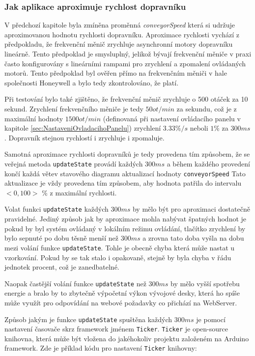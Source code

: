 \subsubsection{Jak aplikace aproximuje rychlost dopravníku}\label{sec:AproximaceRychlostiDopravniku}
V předchozí kapitole byla zmíněna proměnná \textit{conveyorSpeed} která si udržuje aproximovanou hodnotu rychlosti dopravníku. Aproximace rychlosti vychází z předpokladu, že frekvenční měnič zrychluje asynchronní motory dopravníku lineárně. Tento předpoklad je smysluplný, jelikož bývají frekvenční měniče v praxi často konfigurovány s lineárními rampami pro zrychlení a zpomalení ovládaných motorů. Tento předpoklad byl ověřen přímo na frekvenčním měniči v hale společnosti Honeywell a bylo tedy zkontrolováno, že platí.

Při testování bylo také zjištěno, že frekvenční měnič zrychluje o 500 otáček za 10 sekund. Zrychlení frekvenčního měniče je tedy $50ot/min$ za sekundu, což je z maximální hodnoty $1500ot/min$ (definovaná při nastavení ovládacího panelu v kapitole \ref{sec:NastaveniOvladacihoPanelu}) zrychlení $3.33\%/s$ neboli $1\%$ za $300ms$. Dopravník stejnou rychlostí i zrychluje i zpomaluje.

Samotná aproximace rychlosti dopravníků je tedy provedena tím způsobem, že se veřejná metoda \texttt{updateState} provádí každých $300ms$ a během každého provedení končí každá větev stavového diagramu aktualizací hodnoty \texttt{conveyorSpeed} Tato aktualizace je vždy provedena tím způsobem, aby hodnota patřila do intervalu $<0,100>$ \% z maximální rychlosti.

Volat funkci \texttt{updateState} každých $300ms$ by mělo být pro aproximaci dostatečně pravidelné. Jediný způsob jak by aproximace mohla nabývat špatných hodnot je pokud by byl systém ovládaný v lokálním režimu ovládání, tlačítko zrychlení by bylo sepnuté po dobu těsně menší než $300ms$ a zrovna tato doba vyšla na dobu mezi volání funkce \texttt{updateState}. Tohle je obecně chyba která může nastat u vzorkování. Pokud by se tak stalo i opakovaně, stejně by byla chyba v řádu jednotek procent, což je zanedbatelné.

Naopak častější volání funkce \texttt{updateState} než $300ms$ by mělo vyšší spotřebu energie a bralo by to zbytečně výpočetní výkon vývojové desky, která ho spíše může využít pro odpovídání na webové požadavky co přichází na WebServer.

Způsob jakým je funkce \texttt{updateState} spuštěna každých $300ms$ je pomocí nastavení časovače skrz framework jménem \texttt{Ticker}. \texttt{Ticker} je open-source knihovna, která může být vložena do jakéhokoliv projektu založeném na Arduino framework. Zde je příklad kódu pro nastavení \texttt{Ticker} knihovny:

